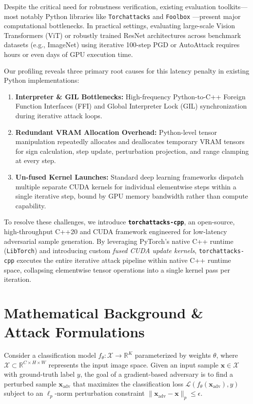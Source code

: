 \documentclass[11pt,onecolumn,a4paper]{article}
\begin{document}
Despite the critical need for robustness verification, existing evaluation toolkits—most notably Python libraries like \texttt{Torchattacks} \cite{kim2020torchattacks} and \texttt{Foolbox} \cite{rauber2017foolbox}—present major computational bottlenecks. In practical settings, evaluating large-scale Vision Transformers (ViT) or robustly trained ResNet architectures across benchmark datasets (e.g., ImageNet) using iterative 100-step PGD or AutoAttack requires hours or even days of GPU execution time. 

Our profiling reveals three primary root causes for this latency penalty in existing Python implementations:
\begin{enumerate}
    \item \textbf{Interpreter & GIL Bottlenecks:} High-frequency Python-to-C++ Foreign Function Interfaces (FFI) and Global Interpreter Lock (GIL) synchronization during iterative attack loops.
    \item \textbf{Redundant VRAM Allocation Overhead:} Python-level tensor manipulation repeatedly allocates and deallocates temporary VRAM tensors for sign calculation, step update, perturbation projection, and range clamping at every step.
    \item \textbf{Un-fused Kernel Launches:} Standard deep learning frameworks dispatch multiple separate CUDA kernels for individual elementwise steps within a single iterative step, bound by GPU memory bandwidth rather than compute capability.
\end{enumerate}

To resolve these challenges, we introduce \textbf{\texttt{torchattacks-cpp}}, an open-source, high-throughput C++20 and CUDA framework engineered for low-latency adversarial sample generation. By leveraging PyTorch's native C++ runtime (\texttt{LibTorch}) and introducing custom \textit{fused CUDA update kernels}, \texttt{torchattacks-cpp} executes the entire iterative attack pipeline within native C++ runtime space, collapsing elementwise tensor operations into a single kernel pass per iteration.

\section{Mathematical Background \& Attack Formulations}

Consider a classification model $f_\theta: \mathcal{X} \to \mathbb{R}^K$ parameterized by weights $\theta$, where $\mathcal{X} \subset \mathbb{R}^{C \times H \times W}$ represents the input image space. Given an input sample $\boldsymbol{x} \in \mathcal{X}$ with ground-truth label $y$, the goal of a gradient-based adversary is to find a perturbed sample $\boldsymbol{x}_{\text{adv}}$ that maximizes the classification loss $\mathcal{L}(f_\theta(\boldsymbol{x}_{\text{adv}}), y)$ subject to an $\ell_p$-norm perturbation constraint $\|\boldsymbol{x}_{\text{adv}} - \boldsymbol{x}\|_p \le \epsilon$.
\end{document}
